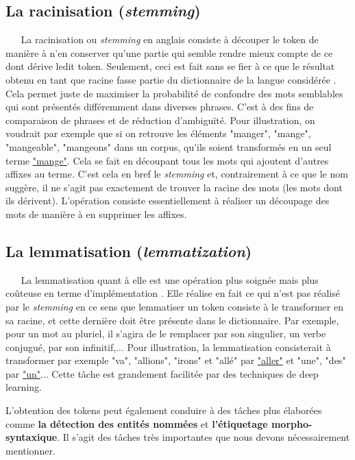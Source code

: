 \subsection{La racinisation (\textit{stemming})}
$ _{} $ $ _{} $ $ _{} $ $ _{} $ $ _{} $La racinisation ou \textit{stemming} en anglais consiste à découper le token de manière à n'en conserver qu'une partie qui semble rendre mieux compte de ce dont dérive ledit token. Seulement, ceci est fait sans se fier à ce que le résultat obtenu en tant que racine fasse partie du dictionnaire de la langue considérée \cite{sarkar2019text,kulkarni2019natural}.\\
Cela permet juste de maximiser la probabilité de confondre des mots semblables qui sont présentés différemment dans diverses phrases. C'est à des fins de comparaison de phrases et de réduction d'ambiguïté. Pour illustration, on voudrait par exemple que si on retrouve les éléments "manger", "mange", "mangeable", "mangeons" dans un corpus, qu'ils soient transformés en un seul terme \underline{"mange"}. Cela se fait en découpant tous les mots qui ajoutent d'autres affixes au terme. C'est cela en bref le \textit{stemming} et, contrairement à ce que le nom suggère, il ne s'agit pas exactement de trouver la racine des mots (les mots dont ils dérivent). L'opération consiste essentiellement à réaliser un découpage des mots de manière à en supprimer les affixes.
\subsection{La lemmatisation (\textit{lemmatization})}
$ _{} $ $ _{} $ $ _{} $ $ _{} $ $ _{} $La lemmatisation quant à elle est une opération plus soignée mais plus coûteuse en terme d'implémentation \cite{sarkar2019text,kulkarni2019natural}. Elle réalise en fait ce qui n'est pas réalisé par le \textit{stemming} en ce sens que lemmatiser un token consiste à le transformer en sa racine, et cette dernière doit être présente dans le dictionnaire. Par exemple, pour un mot au pluriel, il s'agira de le remplacer par son singulier, un verbe conjugué, par son infinitif,... Pour illustration, la lemmatisation consisterait à transformer par exemple "va", "allions", "irons" et "allé" par \underline{"aller"} et "une", "des" par \underline{"un"}... Cette tâche est grandement facilitée par des techniques de deep learning.

L'obtention des tokens peut également conduire à des tâches plus élaborées comme \textbf{la détection des entités nommées} et \textbf{l'étiquetage morpho-syntaxique}. Il s'agit des tâches très importantes que nous devons nécessairement mentionner.
